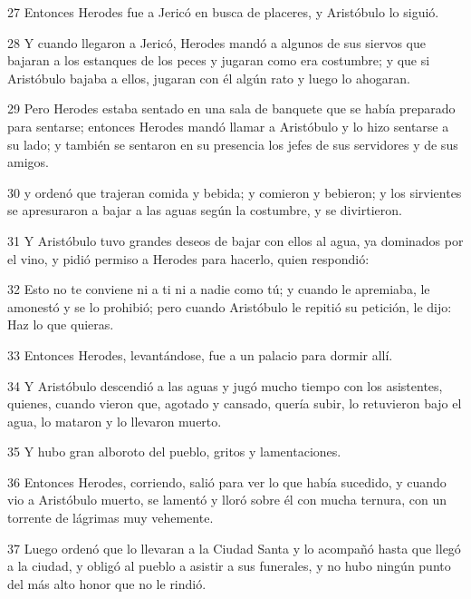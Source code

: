 \par 27 Entonces Herodes fue a Jericó en busca de placeres, y Aristóbulo lo siguió.

\par 28 Y cuando llegaron a Jericó, Herodes mandó a algunos de sus siervos que bajaran a los estanques de los peces y jugaran como era costumbre; y que si Aristóbulo bajaba a ellos, jugaran con él algún rato y luego lo ahogaran.

\par 29 Pero Herodes estaba sentado en una sala de banquete que se había preparado para sentarse; entonces Herodes mandó llamar a Aristóbulo y lo hizo sentarse a su lado; y también se sentaron en su presencia los jefes de sus servidores y de sus amigos.

\par 30 y ordenó que trajeran comida y bebida; y comieron y bebieron; y los sirvientes se apresuraron a bajar a las aguas según la costumbre, y se divirtieron.

\par 31 Y Aristóbulo tuvo grandes deseos de bajar con ellos al agua, ya dominados por el vino, y pidió permiso a Herodes para hacerlo, quien respondió:

\par 32 Esto no te conviene ni a ti ni a nadie como tú; y cuando le apremiaba, le amonestó y se lo prohibió; pero cuando Aristóbulo le repitió su petición, le dijo: Haz lo que quieras.

\par 33 Entonces Herodes, levantándose, fue a un palacio para dormir allí.

\par 34 Y Aristóbulo descendió a las aguas y jugó mucho tiempo con los asistentes, quienes, cuando vieron que, agotado y cansado, quería subir, lo retuvieron bajo el agua, lo mataron y lo llevaron muerto.

\par 35 Y hubo gran alboroto del pueblo, gritos y lamentaciones.

\par 36 Entonces Herodes, corriendo, salió para ver lo que había sucedido, y cuando vio a Aristóbulo muerto, se lamentó y lloró sobre él con mucha ternura, con un torrente de lágrimas muy vehemente.

\par 37 Luego ordenó que lo llevaran a la Ciudad Santa y lo acompañó hasta que llegó a la ciudad, y obligó al pueblo a asistir a sus funerales, y no hubo ningún punto del más alto honor que no le rindió.

